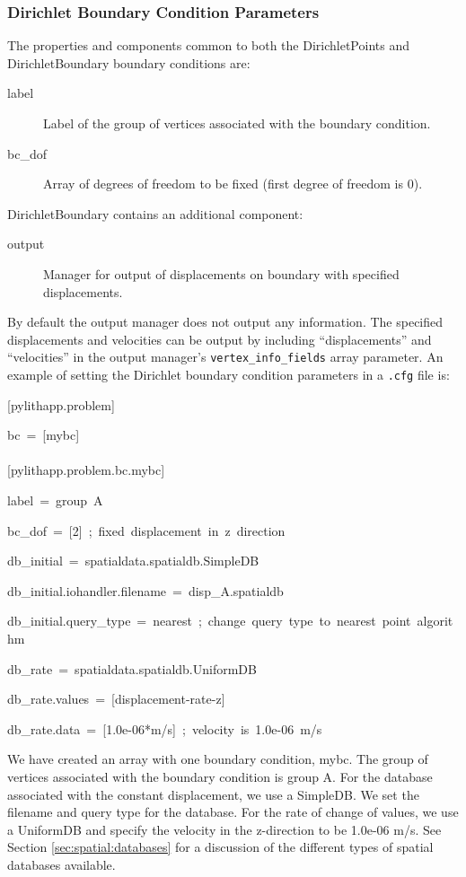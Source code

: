 \subsubsection{Dirichlet Boundary Condition Parameters}

The properties and components common to both the DirichletPoints and
DirichletBoundary boundary conditions are:
\begin{description}
\item [{label}] Label of the group of vertices associated with the boundary
condition.
\item [{bc\_dof}] Array of degrees of freedom to be fixed (first degree
of freedom is 0).
\end{description}
DirichletBoundary contains an additional component:
\begin{description}
\item [{output}] Manager for output of displacements on boundary with specified
displacements.
\end{description}
By default the output manager does not output any information. The
specified displacements and velocities can be output by including
``displacements'' and ``velocities'' in the output manager's \texttt{vertex\_info\_fields}
array parameter. An example of setting the Dirichlet boundary condition
parameters in a \texttt{.cfg} file is:
\begin{lyxcode}
{[}pylithapp.problem{]}

bc~=~{[}mybc{]}~\\
~\\
{[}pylithapp.problem.bc.mybc{]}

label~=~group~A~

bc\_dof~=~{[}2{]}~;~fixed~displacement~in~z~direction

db\_initial~=~spatialdata.spatialdb.SimpleDB

db\_initial.iohandler.filename~=~disp\_A.spatialdb

db\_initial.query\_type~=~nearest~;~change~query~type~to~nearest~point~algorithm

db\_rate~=~spatialdata.spatialdb.UniformDB

db\_rate.values~=~{[}displacement-rate-z{]}

db\_rate.data~=~{[}1.0e-06{*}m/s{]}~;~velocity~is~1.0e-06~m/s
\end{lyxcode}
We have created an array with one boundary condition, mybc. The group
of vertices associated with the boundary condition is group A. For
the database associated with the constant displacement, we use a SimpleDB.
We set the filename and query type for the database. For the rate
of change of values, we use a UniformDB and specify the velocity in
the z-direction to be 1.0e-06 m/s. See Section \ref{sec:spatial:databases}
for a discussion of the different types of spatial databases available.

